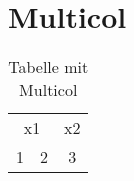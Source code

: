\section{Multicol}
\begin{table}[ht]
\centering
	\begin{tabular}{|c|c|c||}
		\hline
		\multicolumn{2}{|c|}{x1} 	& x2 	\\
		\cline{2-3}
		1 			&		2		& 3		\\
		\hline
	\end{tabular}
\caption{Tabelle mit Multicol}
\end{table}